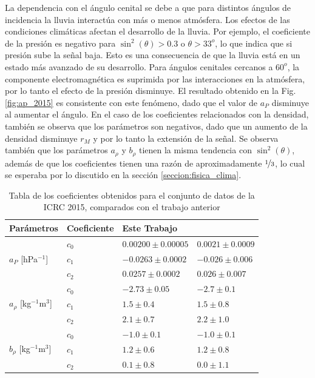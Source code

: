 			La dependencia con el ángulo cenital se debe a que para distintos ángulos de incidencia la lluvia interactúa con más o menos atmósfera. Los efectos de las condiciones climáticas afectan el desarrollo de la lluvia. Por ejemplo, el coeficiente de la presión  es negativo para $\sin^2(\theta)>0.3$ o $\theta>33^o$, lo que indica que si presión sube la señal baja. Esto es una consecuencia de que la lluvia  está en un estado más avanzado de su desarrollo. Para ángulos cenitales cercanos a $60^o$, la componente electromagnética es suprimida por las interacciones en la atmósfera, por lo tanto el efecto de la presión disminuye. El resultado obtenido en la Fig.\,\ref{fig:ap_2015} es consistente con este fenómeno, dado que el valor de $a_P$ disminuye al aumentar el ángulo. 		En el caso de los coeficientes relacionados con la densidad, también se observa que los parámetros son negativos, dado que un aumento de la densidad disminuye $r_M$ y por lo tanto la extensión de la señal. Se observa también que los parámetros $a_\rho$ y $b_\rho$ tienen la misma tendencia con $\sin^2(\theta)$, además de que los coeficientes tienen una razón de aproximadamente $\nicefrac{1}{3}$, lo cual se esperaba por lo discutido en la sección \ref{seccion:fisica_clima}.
					\begin{table}[H]
						\centering
						\begin{tabular}{|l|l|l|l|}\hline
						 	Parámetros									& Coeficiente		& Este Trabajo			& \cite{aab2017impact}	\\ \hline
						 \multirow{3}{*}{$a_P$ [hPa$^{-1}$]}  			&  $c_0$			& $ 0.00200\pm 0.00005$	& $0.0021 \pm 0.0009 $	\\ \cline{2-4} %
						 												&  $c_1$			& $-0.0263 \pm 0.0002$	& $-0.026 \pm 0.006 $	\\ \cline{2-4} 
																		&  $c_2$			& $ 0.0257 \pm 0.0002$	& $0.026  \pm 0.007 $	\\ \hline %
						
						 \multirow{3}{*}{$a_\rho$ [kg$^{-1}$m$^3$]}  	&  $c_0$			& $-2.73   \pm 0.05$	& $ -2.7  \pm 0.1  $\\ \cline{2-4} 
						 												&  $c_1$			& $ 1.5    \pm 0.4 $	& $ 1.5   \pm 0.8  $\\ \cline{2-4} 
																		&  $c_2$			& $ 2.1    \pm 0.7 $	& $ 2.2   \pm 1.0  $\\ \hline %
						
						\multirow{3}{*}{$b_\rho$ [kg$^{-1}$m$^3$]} 		&  $c_0$			& $-1.0    \pm 0.1$		& $-1.0   \pm 0.1 $	\\ \cline{2-4} 
																		&  $c_1$			& $ 1.2    \pm 0.6$		& $ 1.2   \pm 0.8  $	\\ \cline{2-4} 
																		&  $c_2$			& $ 0.1    \pm 0.8$		& $ 0.0   \pm 1.1  $	\\ \hline 
						
						\end{tabular}	
						\caption{Tabla de los coeficientes obtenidos para el conjunto de datos de la ICRC 2015, comparados con el trabajo anterior \cite{aab2017impact}} \label{tabla:cuadratica_ICRC_2015}
					\end{table}

